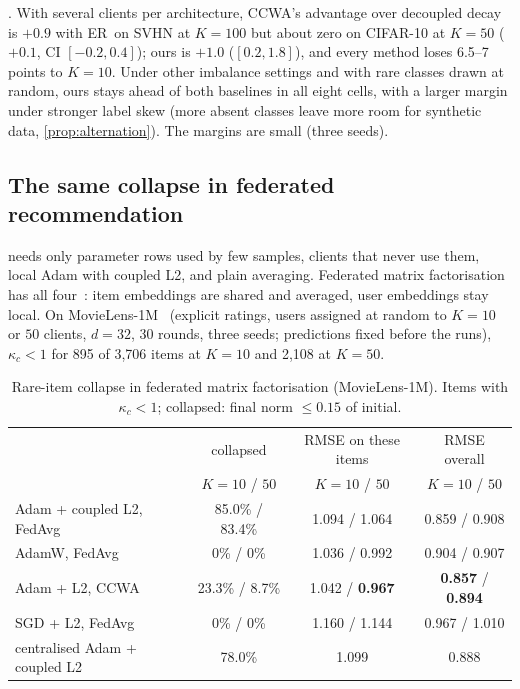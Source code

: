 \documentclass[10pt]{article}
\theoremstyle{plain}
\theoremstyle{definition}
\newcommand{\ER}{\textsc{ER}}
\newcommand{\pos}[1]{\textbf{#1}}
\begin{document}
. With several clients per architecture, CCWA's advantage over decoupled decay is $+0.9$ with \ER\ on
SVHN at $K=100$ but about zero on CIFAR-10 at $K=50$ ($+0.1$, CI $[-0.2,0.4]$); ours is $+1.0$ ($[0.2,1.8]$), and every
method loses 6.5--7 points to $K=10$. Under other imbalance settings and with rare classes drawn at random, ours stays
ahead of both baselines in all eight cells, with a larger margin under stronger label skew (more absent classes leave
more room for synthetic data, \cref{prop:alternation}). The margins are small (three seeds).

\subsection{The same collapse in federated recommendation}\label{sec:recsys}

 needs only parameter rows used by few samples, clients that never use them, local Adam with
coupled L2, and plain averaging. Federated matrix factorisation has all four~\cite{chai2021fedmf}: item embeddings are shared and averaged, user embeddings stay local. On
MovieLens-1M~\cite{harper2015} (explicit ratings, users assigned at random to $K=10$ or $50$ clients, $d=32$, 30 rounds,
three seeds; predictions fixed before the runs), $\kappa_c<1$ for 895 of 3,706 items at $K=10$ and 2,108 at $K=50$.

\begin{table}[t]
\centering\small
\caption{Rare-item collapse in federated matrix factorisation (MovieLens-1M). Items with $\kappa_c<1$; collapsed:
final norm $\le0.15$ of initial.}
\label{tab:recsys}
\begin{tabular}{lccc}
\toprule
& collapsed & RMSE on these items & RMSE overall\\
& $K=10$ / $50$ & $K=10$ / $50$ & $K=10$ / $50$\\
\midrule
Adam + coupled L2, FedAvg & 85.0\% / 83.4\% & 1.094 / 1.064 & 0.859 / 0.908\\
AdamW, FedAvg & 0\% / 0\% & 1.036 / 0.992 & 0.904 / 0.907\\
Adam + L2, CCWA & 23.3\% / 8.7\% & 1.042 / \pos{0.967} & \pos{0.857} / \pos{0.894}\\
SGD + L2, FedAvg & 0\% / 0\% & 1.160 / 1.144 & 0.967 / 1.010\\
centralised Adam + coupled L2 & 78.0\% & 1.099 & 0.888\\
\bottomrule
\end{tabular}
\end{table}
\end{document}
